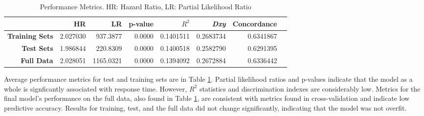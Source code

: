 \documentclass{article}
\begin{document}
\begin{table}[!htbp]
\centering
\begin{tabular}{| r | r | r | r | r  | r | r | r |}
  \hline
 & \textbf{HR} & \textbf{LR} & \textbf{p-value} & \textbf{$R^2$} & \textbf{\textit{Dxy}} & \textbf{Concordance} \\ 
  \hline
  \textbf{Training Sets} & 2.027030 & 937.3877 & 0.0000 & 0.1401511 & 0.2683734 & 0.6341867 \\ 
  \textbf{Test Sets} & 1.986844 & 220.8309 & 0.0000 & 0.1400518 & 0.2582790 & 0.6291395 \\
  \textbf{Full Data} & 2.028051 & 1165.0321 & 0.0000 & 0.1394092 & 0.2672884 & 0.6336442 \\ 
   \hline
\end{tabular}
\caption{Performance Metrics. HR: Hazard Ratio, LR: Partial Likelihood Ratio} 
\label{table:cv}
\end{table}

Average performance metrics for test and training sets are in Table \ref{table:cv}. Partial likelihood ratios and p-values indicate that the model as a whole is signficantly associated with response time. However, $R^2$ statistics and discrimination indexes are considerably low. Metrics for the final model's performance on the full data, also found in Table \ref{table:cv}, are consistent with metrics found in cross-validation and indicate low predictive accuracy. Results for training, test, and the full data did not change significantly, indicating that the model was not overfit. 
\end{document}
